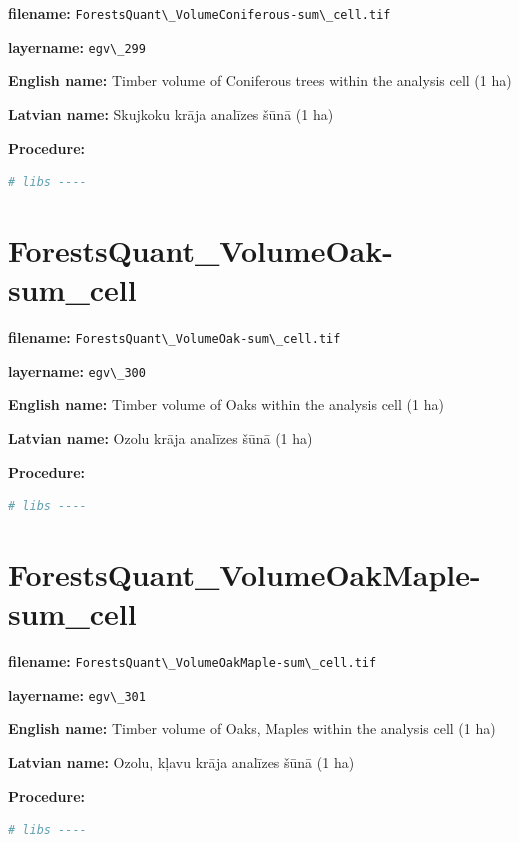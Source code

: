 \documentclass[
]{book}
\newcommand{\passthrough}[1]{#1}
\begin{document}
\textbf{filename:} \passthrough{\lstinline!ForestsQuant\_VolumeConiferous-sum\_cell.tif!}

\textbf{layername:} \passthrough{\lstinline!egv\_299!}

\textbf{English name:} Timber volume of Coniferous trees within the analysis cell (1 ha)

\textbf{Latvian name:} Skujkoku krāja analīzes šūnā (1 ha)

\textbf{Procedure:}

\begin{lstlisting}[language=R]
# libs ----
\end{lstlisting}

\section{ForestsQuant\_VolumeOak-sum\_cell}\label{ch06.300}

\textbf{filename:} \passthrough{\lstinline!ForestsQuant\_VolumeOak-sum\_cell.tif!}

\textbf{layername:} \passthrough{\lstinline!egv\_300!}

\textbf{English name:} Timber volume of Oaks within the analysis cell (1 ha)

\textbf{Latvian name:} Ozolu krāja analīzes šūnā (1 ha)

\textbf{Procedure:}

\begin{lstlisting}[language=R]
# libs ----
\end{lstlisting}

\section{ForestsQuant\_VolumeOakMaple-sum\_cell}\label{ch06.301}

\textbf{filename:} \passthrough{\lstinline!ForestsQuant\_VolumeOakMaple-sum\_cell.tif!}

\textbf{layername:} \passthrough{\lstinline!egv\_301!}

\textbf{English name:} Timber volume of Oaks, Maples within the analysis cell (1 ha)

\textbf{Latvian name:} Ozolu, kļavu krāja analīzes šūnā (1 ha)

\textbf{Procedure:}

\begin{lstlisting}[language=R]
# libs ----
\end{lstlisting}
\end{document}
